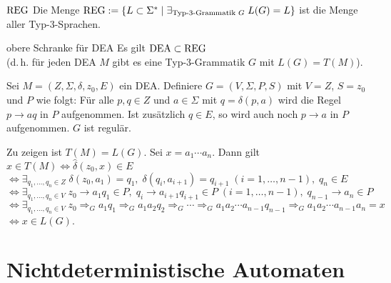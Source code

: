 \begin{Def}{$\text{REG}$}
    Die Menge $\text{REG} := \{L \subset \Sigma^\ast \;|\;
    \exists_{\text{Typ-3-Grammatik } G}\; L(G) = L\}$
    ist die Menge aller Typ-3-Sprachen.
\end{Def}

\begin{Satz}{obere Schranke für DEA}
    Es gilt $\text{DEA} \subset \text{REG}$\\
    (d.\,h. für jeden DEA $M$ gibt es eine Typ-3-Grammatik
    $G$ mit $L(G) = T(M)$).
\end{Satz}

\begin{Beweis}
    Sei $M = (Z, \Sigma, \delta, z_0, E)$ ein DEA.
    Definiere $G = (V, \Sigma, P, S)$ mit $V = Z$, $S = z_0$ und $P$ wie folgt:
    Für alle $p, q \in Z$ und $a \in \Sigma$ mit $q = \delta(p, a)$ wird
    die Regel $p \rightarrow aq$ in $P$ aufgenommen.
    Ist zusätzlich $q \in E$, so wird auch noch $p \rightarrow a$ in $P$
    aufgenommen.
    $G$ ist regulär.

    Zu zeigen ist $T(M) = L(G)$.
    Sei $x = a_1 \dotsb a_n$. Dann gilt
    $x \in T(M)
    \iff \widehat{\delta}(z_0, x) \in E$\\
    $\iff \exists_{q_1, \dotsc, q_n \in Z}\; \delta(z_0, a_1) = q_1,\;
    \delta(q_i, a_{i+1}) = q_{i+1}\; (i = 1, \dotsc, n - 1),\;
    q_n \in E$\\
    $\iff \exists_{q_1, \dotsc, q_n \in V}\; z_0 \rightarrow a_1 q_1 \in P,\;
    q_i \rightarrow a_{i+1} q_{i+1} \in P\; (i = 1, \dotsc, n - 1),\;
    q_{n-1} \rightarrow a_n \in P$\\
    $\iff \exists_{q_1, \dotsc, q_n \in V}\;
    z_0 \Rightarrow_G a_1 q_1 \Rightarrow_G a_1 a_2 q_2 \Rightarrow_G
    \dotsb \Rightarrow_G a_1 a_2 \dotsb a_{n-1} q_{n-1} \Rightarrow_G
    a_1 a_2 \dotsb a_{n-1} a_n = x$\\
    $\iff x \in L(G)$.
\end{Beweis}

\section{%
    Nichtdeterministische Automaten%
}

